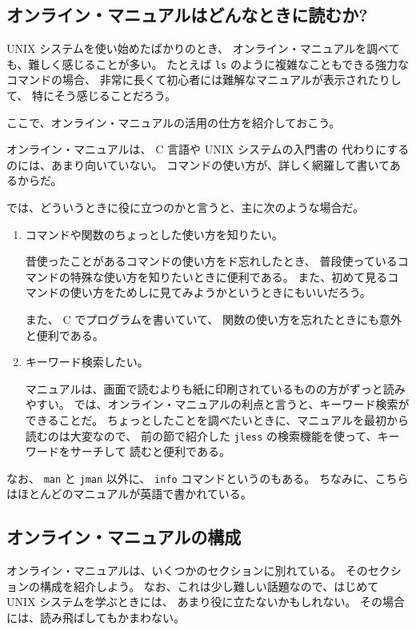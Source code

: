 \subsection{オンライン・マニュアルはどんなときに読むか?}

UNIX システムを使い始めたばかりのとき、
オンライン・マニュアルを調べても、難しく感じることが多い。
たとえば \texttt{ls} のように複雑なこともできる強力なコマンドの場合、
非常に長くて初心者には難解なマニュアルが表示されたりして、
特にそう感じることだろう。

ここで、オンライン・マニュアルの活用の仕方を紹介しておこう。

\bigskip

オンライン・マニュアルは、 C 言語や UNIX システムの入門書の
代わりにするのには、あまり向いていない。
コマンドの使い方が、詳しく網羅して書いてあるからだ。

では、どういうときに役に立つのかと言うと、主に次のような場合だ。

\begin{enumerate}
\item コマンドや関数のちょっとした使い方を知りたい。

昔使ったことがあるコマンドの使い方をド忘れしたとき、
普段使っているコマンドの特殊な使い方を知りたいときに便利である。
また、初めて見るコマンドの使い方をためしに見てみようかというときにもいいだろう。

また、 C でプログラムを書いていて、
関数の使い方を忘れたときにも意外と便利である。
\item キーワード検索したい。

マニュアルは、画面で読むよりも紙に印刷されているものの方がずっと読みやすい。
では、オンライン・マニュアルの利点と言うと、キーワード検索ができることだ。
ちょっとしたことを調べたいときに、マニュアルを最初から読むのは大変なので、
前の節で紹介した \texttt{jless} の検索機能を使って、キーワードをサーチして
読むと便利である。
\end{enumerate}

なお、 \texttt{man} と \texttt{jman} 以外に、
 \texttt{info} コマンドというのもある。
ちなみに、こちらはほとんどのマニュアルが英語で書かれている。


\subsection{オンライン・マニュアルの構成}

オンライン・マニュアルは、いくつかのセクションに別れている。
そのセクションの構成を紹介しよう。
なお、これは少し難しい話題なので、はじめて UNIX システムを学ぶときには、
あまり役に立たないかもしれない。
その場合には、読み飛ばしてもかまわない。

